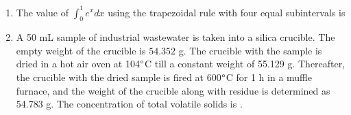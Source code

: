 \documentclass[journal,12pt,onecolumn]{article}
\theoremstyle{remark}
\begin{document}
\begin{enumerate}
\item The value of $\int_0^1 e^x dx$ using the trapezoidal rule with four equal subintervals is

\hfill{}
\begin{enumerate}
\end{enumerate}

\item A 50 mL sample of industrial wastewater is taken into a silica crucible. The empty weight of the crucible is $54.352$ g. The crucible with the sample is dried in a hot air oven at 104$\degree$C till a constant weight of 55.129 g. Thereafter, the crucible with the dried sample is fired at 600$\degree$C for 1 h in a muffle furnace, and the weight of the crucible along with residue is determined as 54.783 g. The concentration of total volatile solids is \underline{\hspace{2cm}}.

\hfill{}
\begin{enumerate}
\end{enumerate}


\end{enumerate}
\end{document}
